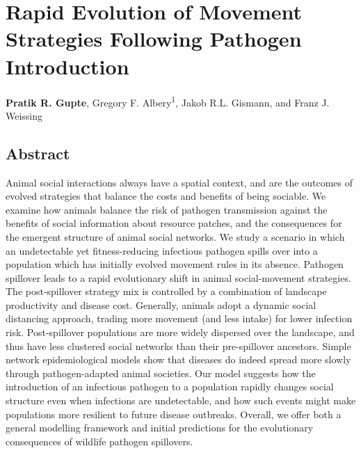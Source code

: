 \chapter{Rapid Evolution of Movement Strategies Following Pathogen Introduction}\label{ch:pathomove}

\noindent \textbf{Pratik R. Gupte}, Gregory F. Albery\textsuperscript{1}, Jakob R.L. Gismann, and Franz J. Weissing


\section*{Abstract}

\footnotesize{
    Animal social interactions always have a spatial context, and are the outcomes of evolved strategies that balance the costs and benefits of being sociable.
    We examine how animals balance the risk of pathogen transmission against the benefits of social information about resource patches, and the consequences for the emergent structure of animal social networks.
    We study a scenario in which an undetectable yet fitness-reducing infectious pathogen spills over into a population which has initially evolved movement rules in its absence.
    Pathogen spillover leads to a rapid evolutionary shift in animal social-movement strategies.
    The post-spillover strategy mix is controlled by a combination of landscape productivity and disease cost.
    Generally, animals adopt a dynamic social distancing approach, trading more movement (and less intake) for lower infection risk.
    Post-spillover populations are more widely dispersed over the landscape, and thus have less clustered social networks than their pre-spillover ancestors.
    Simple network epidemiological models show that diseases do indeed spread more slowly through pathogen-adapted animal societies.
    Our model suggests how the introduction of an infectious pathogen to a population rapidly changes social structure even when infections are undetectable, and how such events might make populations more resilient to future disease outbreaks.
    Overall, we offer both a general modelling framework and initial predictions for the evolutionary consequences of wildlife pathogen spillovers.

    \medskip

}

\clearpage